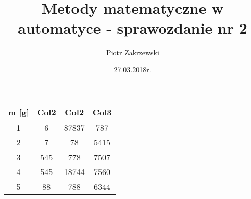 \documentclass[11pt,a4paper]{article}
\title{Metody matematyczne w automatyce - sprawozdanie nr 2}
\author{Piotr Zakrzewski}
\date{27.03.2018r.}
\begin{document}
\begin{center}
 \begin{tabular}{||c c c c||} 
 \hline
 m [g] & Col2 & Col2 & Col3 \\ [0.5ex] 
 \hline\hline
 1 & 6 & 87837 & 787 \\ 
 \hline
 2 & 7 & 78 & 5415 \\
 \hline
 3 & 545 & 778 & 7507 \\
 \hline
 4 & 545 & 18744 & 7560 \\
 \hline
 5 & 88 & 788 & 6344 \\ [1ex] 
 \hline
\end{tabular}
\end{center}
\end{document}
